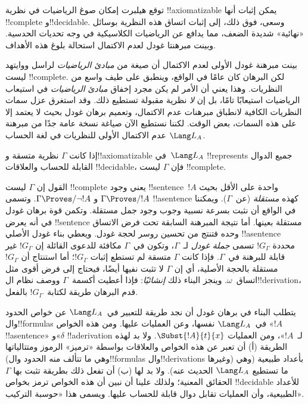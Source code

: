 \documentclass[../../../include/open-logic-section]{subfiles}
\begin{document}


توقع هيلبرت إمكان صوغ الرياضيات في نظرية !!{axiomatizable} يمكن
إثبات أنها !!{complete} و!!{decidable}. وسعى، فوق ذلك، إلى إثبات
اتساق هذه النظرية بوسائل «نهائية» شديدة الضعف، مما يدافع عن الرياضيات
الكلاسيكية في وجه تحديات الحدسية. وبينت مبرهنتا غودل لعدم الاكتمال
استحالة بلوغ هذه الأهداف.

بينت مبرهنة غودل الأولى لعدم الاكتمال أن صيغة من \emph{مبادئ
الرياضيات} لراسل ووايتهد ليست !!{complete}. لكن البرهان كان عامًا في
الواقع، وينطبق على طيف واسع من النظريات. وهذا يعني أن الأمر لم يكن
مجرد إخفاق \emph{مبادئ الرياضيات} في استيعاب الرياضيات استيعابًا
تامًا، بل إن \emph{لا} نظرية مقبولة تستطيع ذلك. وقد استغرق عزل سمات
النظريات الكافية لانطباق مبرهنات عدم الاكتمال، وتعميم برهان غودل بحيث
لا يعتمد إلا على هذه السمات، بعض الوقت. لكننا نستطيع الآن صياغة نسخة
عامة جدًا من مبرهنة عدم الاكتمال الأولى للنظريات في لغة الحساب
$\Lang L_A$.

\begin{thm}
إذا كانت $\Gamma$ نظرية متسقة و!!{axiomatizable} في~$\Lang L_A$
!!{represents} جميع الدوال القابلة للحساب والعلاقات !!{decidable}،
فإن $\Gamma$ ليست !!{complete}.
\end{thm}

القول إن $\Gamma$ ليست !!{complete} يعني وجود !!{sentence}~$!A$
واحدة على الأقل بحيث $\Gamma\Proves/ !A$ و
$\Gamma\Proves/\lnot !A$. وتسمى !!a{sentence} كهذه \emph{مستقلة}
(عن~$\Gamma$). ويمكننا في الواقع أن نثبت بسرعة نسبية وجوب وجود جمل
مستقلة. وتكمن قوة برهان غودل في أنه يعرض !!{sentence} مستقلة بعينها.
أما نتيجة المبرهنة السابقة تحت فرض الاتساق وحده فتنتج من
تحسين روسر لحجة غودل. ويعطي بناء غودل الأصلي !!a{sentence} محددة
$!G_\Gamma$ تسمى \emph{جملة غودل} لـ~$\Gamma$، وتكون في~$\Gamma$
مكافئة للدعوى القائلة إن $!G_\Gamma$ غير قابلة للبرهنة في~$\Gamma$.
فإذا كانت $\Gamma$ متسقة لم تستطع إثبات $!G_\Gamma$؛ أما استنتاج أن
$!G_\Gamma$ مستقلة بالحجة الأصلية، أي إن $\Gamma$ لا تثبت نفيها
أيضًا، فيحتاج إلى فرض أقوى مثل اتساق~$\omega$. وينجز البناء ذلك
\emph{إنشائيًا}: فإذا أعطيت أكسمة~$\Gamma$ ووصف نظام ال!!{derivation}،
قدم البرهان طريقة لكتابة~$!G_\Gamma$ بالفعل.

يتطلب البناء في برهان غودل أن نجد طريقة للتعبير في~$\Lang L_A$ عن
خواص الحدود وال!!{formula}s في~$\Lang L_A$ نفسها، وعن العمليات
عليها. ومن هذه الخواص «$!A$ !!a{sentence}» و«$\delta$
!!a{derivation} لـ~$!A$»، ومن العمليات $\Subst{!A}{t}{x}$. ولا بد
لهذه الطريقة (أ) أن تعبر عن هذه الخواص والعلاقات بواسطة «ترميز»
الرموز ومتتالياتها (وهي ما تتألف منه الحدود وال!!{formula}s
وال!!{derivation}s وغيرها) بأعداد طبيعية (وهي ما تستطيع $\Lang L_A$
الحديث عنه). ولا بد لها (ب) أن تفعل ذلك بطريقة تثبت بها $\Gamma$
الحقائق المعنية؛ ولذلك علينا أن نبين أن هذه الخواص ترمز بخواص
!!{decidable} للأعداد الطبيعية، وأن العمليات تقابل دوال قابلة للحساب
عليها. ويسمى هذا «حوسبة التركيب».
\end{document}
